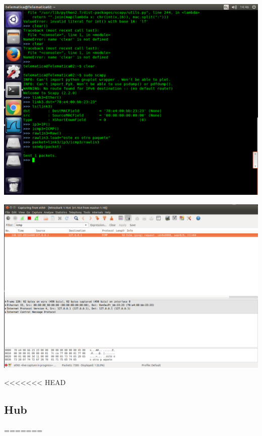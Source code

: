 \documentclass[spanish]{udpreport}
\begin{document}

\begin{center}
	\includegraphics[scale=.37]{imagenes/Switch/Test_3.png}
\end{center}



\begin{center}
	\includegraphics[scale=.37]{imagenes/Switch/Test_3_Wireshark.png}
\end{center}

\newpage

<<<<<<< HEAD
\subsection{Hub}
=======
\end{document}
